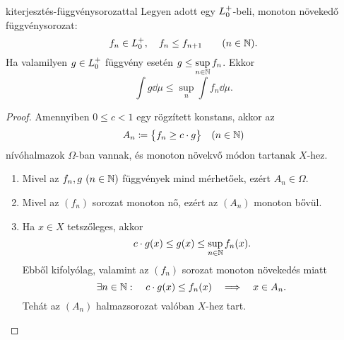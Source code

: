 \documentclass[
]{elteikthesis}[2024/04/26]
\begin{document}
	\begin{theorem}{}{kiterjesztés-függvénysorozattal}
		Legyen adott egy \( \StepFuncPos \)-beli, monoton növekedő függvénysorozat:
		\[
			f_n \in \StepFuncPos, \quad f_n \leq f_{n + 1} \qquad (n \in \N).
		\]
		Ha valamilyen \( g \in \StepFuncPos \) függvény
		esetén \( g \leq \sup\limits_{n \in \mathbb{N}} f_n \). Ekkor
		\[
			\int g \dd{\mu} \leq \sup_{n} \int f_n \dd{\mu}.
		\]
	\end{theorem}
	\begin{proof}
		Amennyiben \( 0 \leq c < 1 \) egy rögzített konstans, akkor az
		\[
			A_n \coloneq \bigl\{ f_n \geq c \cdot g \bigr\} \quad (n \in \mathbb{N})
		\]
		nívóhalmazok \( \Omega \)-ban vannak, és monoton növekvő módon tartanak \( X \)-hez.
		
		\begin{enumerate}
			\item
			Mivel az \( f_n, g \ (n \in \mathbb{N}) \) függvények mind mérhetőek, ezért \( A_n \in \Omega \). \checkmark
			
			\item 
			Mivel az \( (f_n) \) sorozat monoton nő, ezért az \( (A_n) \) monoton bővül. \checkmark
			
			\item Ha \( x \in X \) tetszőleges, akkor
			\[
				c \cdot g(x) \leq g(x) \leq \sup_{n \in \mathbb{N}} f_n(x).
			\]
			Ebből kifolyólag, valamint az \( (f_n) \) sorozat monoton növekedés miatt
			\[
				\exists n \in \mathbb{N} \, \colon \quad
				c \cdot g(x) \leq f_n(x)
				\quad \Longrightarrow \quad
				x \in A_n.
			\]
			Tehát az \( (A_n) \) halmazsorozat valóban \( X \)-hez tart. \checkmark
		\end{enumerate}
			
%			
		

\end{proof}
\end{document}
